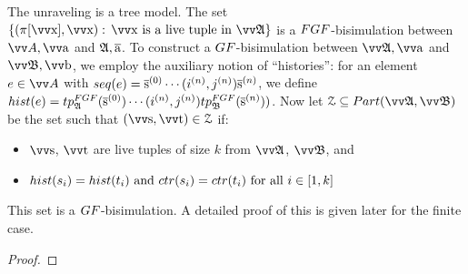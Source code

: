 \thminfunraveling*
\begin{proofsketch}
  The unraveling is a tree model.
  The set $\{(\pi[\elemtuptuplex], \elemtuptuplex):\, \elemtuptuplex\ \text{is a live tuple in}\ \unravel{A} \}$ is a $\FGF$-bisimulation between $\unraveldom{A}, \elemtuptuplea$ and ${\mathfrak{A}}, \overline{\mathrm{a}}$.
  To construct a $\GF$-bisimulation between $\unravel{A}, \elemtuptuplea$ and $\unravel{B}, \elemtuptupleb$, we employ the auxiliary notion of ``histories'': for an element $e \in \unraveldom{A}$ with $\seq{e} = \elemtuples^{(0)}\cdots(i^{(n)}, j^{(n)})\elemtuples^{(n)}$, we define $\mathsf{hist}(e) = \tp{\FGF}{\str{A}}{\elemtuples^{(0)}} \cdots (i^{(n)}, j^{(n)}) \tp{\FGF}{\str{B}}{\elemtuples^{(n)}})$.
  Now let $\bisimZ \subseteq \PartIso{\unravel{A}}{\unravel{B}}$ be the set such that $(\elemtuptuples, \elemtuptuplet) \in \bisimZ$ if:
  \begin{itemize}
    \item $\elemtuptuples$, $\elemtuptuplet$ are live tuples of size $k$ from $\unravel{A}$, $\unravel{B}$, and
    \item $\mathsf{hist}(s_{i}) = \mathsf{hist}(t_{i})\text{ and }\ctr{s_{i}} = \ctr{t_{i}}\text{ for all }i \in [1, k]$
  \end{itemize}
  This set is a $\GF$-bisimulation.
  A detailed proof of this is given later for the finite case.
\end{proofsketch}
\begin{proof}
\end{proof}
